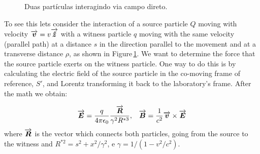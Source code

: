 \begin{figure}[hb!]
\centering
\label{fig:wake1}
\caption{Duas partículas interagindo via campo direto.}
\end{figure}

To see this lets consider the interaction of a source particle $Q$ moving with velocity $\overrightarrow{\boldsymbol{v}}=v{\overrightarrow{\boldsymbol{\hat{z}}}}$ with a witness particle $q$ moving with the same velocity (parallel path) at a distance $s$ in the direction parallel to the movement and at a transverse distance $\rho$, as shown in Figure\,\ref{fig:wake1}. We want to determine the force that the source particle exerts on the witness particle. One way to do this is by calculating the electric field of the source particle in the co-moving frame of reference, $S'$, and Lorentz transforming it back to the laboratory's frame. After the math we obtain:

\begin{align}
 \label{eq:fields_free_particle}
 \overrightarrow{\boldsymbol{E}} = \frac{q}{4\pi\epsilon_0}\frac{\overrightarrow{\boldsymbol{R}}}{\gamma^2 R^{*3}}, & & \overrightarrow{\boldsymbol{B}} = \frac{1}{c^2}\overrightarrow{\boldsymbol{v}} \times \overrightarrow{\boldsymbol{E}} 
\end{align}
where $\overrightarrow{\boldsymbol{R}}$ is the vector which connects both particles, going from the source to the witness and  $R^{*2} = s^2 + x^2/\gamma^2$, e $\gamma = 1/(1-v^2/c^2)$.

